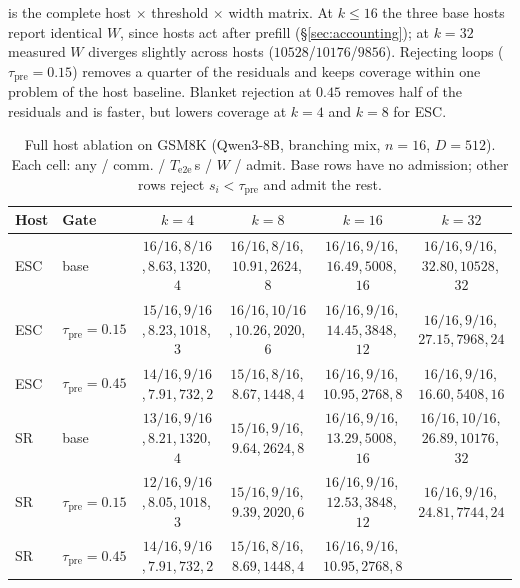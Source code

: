  is the complete host $\times$ threshold $\times$ width matrix.
At $k\le16$ the three base hosts report identical $W$, since hosts act after prefill (\S\ref{sec:accounting}); at $k{=}32$ measured $W$ diverges slightly across hosts ($10528$/$10176$/$9856$).
Rejecting loops ($\tau_{\mathrm{pre}}{=}0.15$) removes a quarter of the residuals
and keeps coverage within one problem of the host baseline.
Blanket rejection at $0.45$ removes half of the residuals and is faster, but
lowers coverage at $k{=}4$ and $k{=}8$ for ESC.

\begin{table}[t]
\centering
\caption{Full host ablation on GSM8K (Qwen3-8B, branching mix, $n{=}16$, $D{=}512$).
Each cell: any / comm. / $T_{\mathrm{e2e}}$\,s / $W$ / admit.
Base rows have no admission; other rows reject $s_i{<}\tau_{\mathrm{pre}}$ and admit the rest.}
\label{tab:ablate-thresh}
\scriptsize
\setlength{\tabcolsep}{1.8pt}
\begin{tabular}{@{}llcccc@{}}
\toprule
Host & Gate & $k{=}4$ & $k{=}8$ & $k{=}16$ & $k{=}32$ \\
\midrule
ESC
 & base
 & $16/16$,\,$8/16$,\,$8.63$,\,$1320$,\,$4$
 & $16/16$,\,$8/16$,\,$10.91$,\,$2624$,\,$8$
 & $16/16$,\,$9/16$,\,$16.49$,\,$5008$,\,$16$
 & $16/16$,\,$9/16$,\,$32.80$,\,$10528$,\,$32$ \\
\rowcolor{tblalt}
ESC
 & $\tau_{\mathrm{pre}}{=}0.15$
 & $15/16$,\,$9/16$,\,$8.23$,\,$1018$,\,$3$
 & $16/16$,\,$10/16$,\,$10.26$,\,$2020$,\,$6$
 & $16/16$,\,$9/16$,\,$14.45$,\,$3848$,\,$12$
 & $16/16$,\,$9/16$,\,$27.15$,\,$7968$,\,$24$ \\
ESC
 & $\tau_{\mathrm{pre}}{=}0.45$
 & $14/16$,\,$9/16$,\,$7.91$,\,$732$,\,$2$
 & $15/16$,\,$8/16$,\,$8.67$,\,$1448$,\,$4$
 & $16/16$,\,$9/16$,\,$10.95$,\,$2768$,\,$8$
 & $16/16$,\,$9/16$,\,$16.60$,\,$5408$,\,$16$ \\
\midrule
SR
 & base
 & $13/16$,\,$9/16$,\,$8.21$,\,$1320$,\,$4$
 & $15/16$,\,$9/16$,\,$9.64$,\,$2624$,\,$8$
 & $16/16$,\,$9/16$,\,$13.29$,\,$5008$,\,$16$
 & $16/16$,\,$10/16$,\,$26.89$,\,$10176$,\,$32$ \\
\rowcolor{tblalt}
SR
 & $\tau_{\mathrm{pre}}{=}0.15$
 & $12/16$,\,$9/16$,\,$8.05$,\,$1018$,\,$3$
 & $15/16$,\,$9/16$,\,$9.39$,\,$2020$,\,$6$
 & $16/16$,\,$9/16$,\,$12.53$,\,$3848$,\,$12$
 & $16/16$,\,$9/16$,\,$24.81$,\,$7744$,\,$24$ \\
SR
 & $\tau_{\mathrm{pre}}{=}0.45$
 & $14/16$,\,$9/16$,\,$7.91$,\,$732$,\,$2$
 & $15/16$,\,$8/16$,\,$8.69$,\,$1448$,\,$4$
 & $16/16$,\,$9/16$,\,$10.95$,\,$2768$,\,$8$

\end{tabular}
\end{table}
